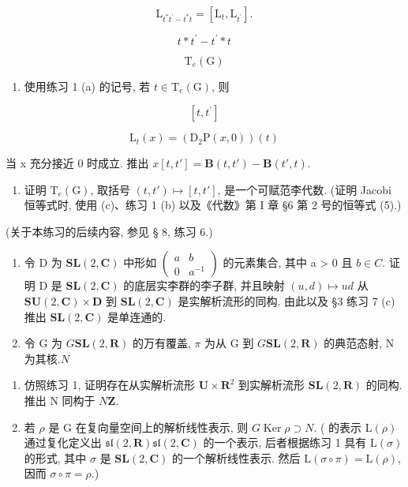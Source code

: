 \[
\mathrm{L} _ {t ^ {*} t ^ {\prime} - t ^ {*} t} = \left[ \mathrm{L} _ {t}, \mathrm{L} _ {t ^ {\prime}} \right].
\]

\[
t * t ^ {\prime} - t ^ {\prime} * t
\]

\[
\mathrm{T} _ {e} (\mathrm{G})
\]

\begin{enumerate}
\def\labelenumi{(\alph{enumi})}
\setcounter{enumi}{2}
\tightlist
\item
  使用练习 1 (a) 的记号, 若 \(t \in \mathrm{T}_e(\mathrm{G})\), 则
\end{enumerate}

\[
[ t, t ^ {\prime} ]
\]

\[
\mathrm{L} _ {t} (x) = (\mathrm{D} _ {2} \mathrm{P} (x, 0)) (t)
\]

当 x 充分接近 0 时成立. 推出 \(x\)\([t, t'] = \mathbf{B}(t, t') - \mathbf{B}(t', t)\).

\begin{enumerate}
\def\labelenumi{(\alph{enumi})}
\setcounter{enumi}{3}
\tightlist
\item
  证明 \(\mathrm{T}_e(\mathrm{G})\), 取括号 \((t, t') \mapsto [t, t']\), 是一个可赋范李代数. (证明 Jacobi 恒等式时, 使用 (c)、练习 1 (b) 以及《代数》第 I 章 §6 第 2 号的恒等式 (5).)
\end{enumerate}

(关于本练习的后续内容, 参见 § 8, 练习 6.)


\begin{enumerate}
\def\labelenumi{\arabic{enumi}.}
\item
  令 D 为 \(\mathbf{SL}(2,\mathbf{C})\) 中形如 \(\begin{pmatrix}a & b \\ 0 & a^{-1}\end{pmatrix}\) 的元素集合, 其中 a \textgreater{} 0 且 \(b \in C\). 证明 D 是 \(\mathbf{SL}(2,\mathbf{C})\) 的底层实李群的李子群, 并且映射 \((u,d) \mapsto ud\) 从 \(\mathbf{SU}(2,\mathbf{C}) \times \mathbf{D}\) 到 \(\mathbf{SL}(2,\mathbf{C})\) 是实解析流形的同构. 由此以及 §3 练习 7 (c) 推出 \(\mathbf{SL}(2,\mathbf{C})\) 是单连通的.
\item
  令 G 为 \(G\)\(\mathbf{SL}(2, \mathbf{R})\) 的万有覆盖, \(\pi\) 为从 G 到 \(G\)\(\mathbf{SL}(2, \mathbf{R})\) 的典范态射, N 为其核.\(N\)
\end{enumerate}

\begin{enumerate}
\def\labelenumi{(\alph{enumi})}
\item
  仿照练习 1, 证明存在从实解析流形 \(\mathbf{U} \times \mathbf{R}^2\) 到实解析流形 \(\mathbf{SL}(2, \mathbf{R})\) 的同构. 推出 N 同构于 \(N\)\(\mathbf{Z}\).
\item
  若 \(\rho\) 是 G 在复向量空间上的解析线性表示, 则 \(G\)\(\operatorname{Ker} \rho \supset N\). ( 的表示 \(\mathrm{L}(\rho)\) 通过复化定义出 \(\mathfrak{sl}(2, \mathbf{R})\)\(\mathfrak{sl}(2, \mathbf{C})\) 的一个表示, 后者根据练习 1 具有 \(\mathrm{L}(\sigma)\) 的形式, 其中 \(\sigma\) 是 \(\mathbf{SL}(2, \mathbf{C})\) 的一个解析线性表示. 然后 \(\mathrm{L}(\sigma \circ \pi) = \mathrm{L}(\rho)\), 因而 \(\sigma \circ \pi = \rho\).)
\end{enumerate}

